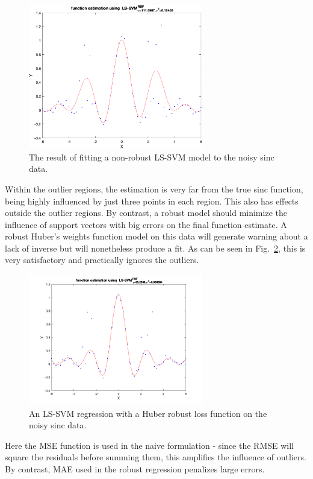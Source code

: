 \documentclass[10pt,a4paper]{article}
\begin{document}
\begin{figure}[h!]
\centering
  \includegraphics[width=3in]{naiveNonRob.png}
  \caption{The result of fitting a non-robust LS-SVM model to the noisy sinc data.}
  \label{fig:naiveNonRob}
\end{figure}


Within the outlier regions, the estimation is very far from the true sinc function, being highly influenced by just three points in each region. This also has effects outside the outlier regions. 
By contrast, a robust model should minimize the influence of support vectors with big errors on the final function estimate. A robust Huber's weights function model on this data will generate warning about a lack of inverse but will nonetheless produce a fit. As can be seen in Fig.~\ref{fig:whuberRobust}, this is very satisfactory and practically ignores the outliers.

\begin{figure}[h!]
\centering
  \includegraphics[width=3in]{whuberRobust.png}
  \caption{An LS-SVM regression with a Huber robust loss function on the noisy sinc data.}
  \label{fig:whuberRobust}
\end{figure}

Here the MSE function is used in the naive formulation - since the RMSE will square the residuals before summing them, this amplifies the influence of outliers. By contrast, MAE used in the robust regression penalizes large errors.
\end{document}

